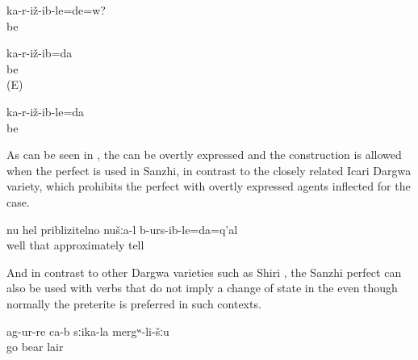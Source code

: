 \begin{exe}
	\ex	\label{ex:Are you sitting (seated) analytic}
	\gll	ka-r-iž-ib-le=de=w?\\
		be\\
	\glt	{}

	\ex	\label{ex:I am sitting sat down analytic}
	\begin{xlist}
		\ex	\label{ex:I sat down analytic}
		\gll	ka-r-iž-ib=da\\
			be\\
		\glt	{} (E)

		\ex	\label{ex:I am sitting analytic}
		\gll	ka-r-iž-ib-le=da\\
			be\\
		\glt	{}
	\end{xlist}
\end{exe}

As can be seen in , the  can be overtly expressed and the  construction is allowed when the perfect is used in Sanzhi, in contrast to the closely related Icari Dargwa variety, which prohibits the perfect with overtly expressed agents inflected for the  case.

\begin{exe}
	\ex	\label{ex:Well, approximately we already said it analytic}
	\gll	nu	hel	priblizitelno	nušːa-l	b-urs-ib-le=da=q'al\\
		well	that	approximately		tell\\
	\glt	{}
	\end{exe}
	
And in contrast to other Dargwa varieties such as Shiri \citep{BelyaevInPreparation}, the Sanzhi perfect can also be used with verbs that do not imply a change of state in the   even though normally the preterite is preferred in such contexts. 

\begin{exe}
	\ex	\label{ex:‎‎‎(Apparently,) they have gone to the cave of the bear}
	\gll	ag-ur-re	ca-b	sːika-la	mergʷ-li-šːu\\
		go		bear	lair\\
	\glt	{}
\end{exe}

